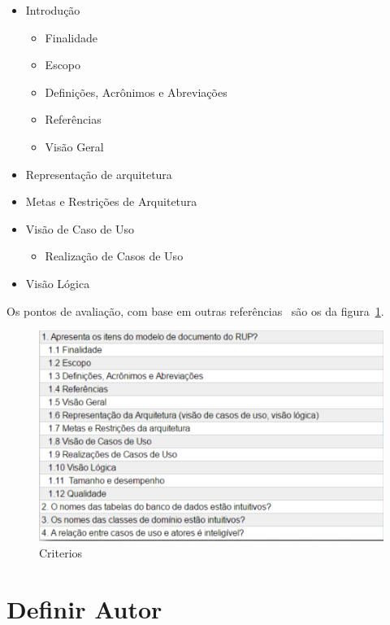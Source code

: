     \begin{itemize}
        \item Introdução
            \begin{itemize}
                \item Finalidade     
                \item Escopo     
                \item Definições, Acrônimos e Abreviações     
                \item Referências     
                \item Visão Geral
            \end{itemize}
        \item Representação de arquitetura
        \item Metas e Restrições de Arquitetura
        \item Visão de Caso de Uso 
            \begin{itemize}
                \item Realização de Casos de Uso
            \end{itemize}
        \item Visão Lógica
    \end{itemize}

    Os pontos de avaliação, com base em outras referências~\cite{} são os da figura~\ref{fig:criterios}.

\begin{figure}[H]
  \center
  \includegraphics[width=1\textwidth]{figuras/criterios.png}
  \caption{Criterios}
  \label{fig:criterios}
\end{figure}

\section{Definir Autor}

